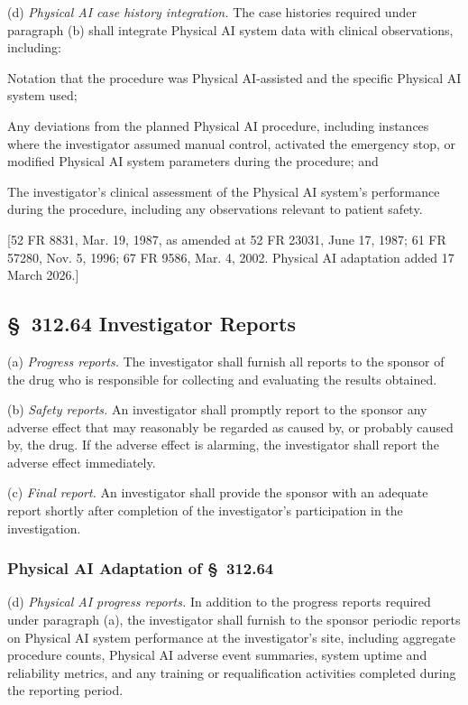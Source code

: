 \documentclass[11pt]{article}
\begin{document}
(d) \textit{Physical AI case history integration.} The case histories required under paragraph (b) shall integrate Physical AI system data with clinical observations, including:

\begin{description}[leftmargin=0.8cm,style=sameline]
\item[(i)] Notation that the procedure was Physical AI-assisted and the specific Physical AI system used;
\item[(ii)] Any deviations from the planned Physical AI procedure, including instances where the investigator assumed manual control, activated the emergency stop, or modified Physical AI system parameters during the procedure; and
\item[(iii)] The investigator's clinical assessment of the Physical AI system's performance during the procedure, including any observations relevant to patient safety.
\end{description}

[52 FR 8831, Mar. 19, 1987, as amended at 52 FR 23031, June 17, 1987; 61 FR 57280, Nov. 5, 1996; 67 FR 9586, Mar. 4, 2002. Physical AI adaptation added 17 March 2026.]

\subsection{\S~312.64 Investigator Reports}

(a) \textit{Progress reports.} The investigator shall furnish all reports to the sponsor of the drug who is responsible for collecting and evaluating the results obtained.

(b) \textit{Safety reports.} An investigator shall promptly report to the sponsor any adverse effect that may reasonably be regarded as caused by, or probably caused by, the drug. If the adverse effect is alarming, the investigator shall report the adverse effect immediately.

(c) \textit{Final report.} An investigator shall provide the sponsor with an adequate report shortly after completion of the investigator's participation in the investigation.

\subsubsection{Physical AI Adaptation of \S~312.64}

(d) \textit{Physical AI progress reports.} In addition to the progress reports required under paragraph (a), the investigator shall furnish to the sponsor periodic reports on Physical AI system performance at the investigator's site, including aggregate procedure counts, Physical AI adverse event summaries, system uptime and reliability metrics, and any training or requalification activities completed during the reporting period.
\end{document}
